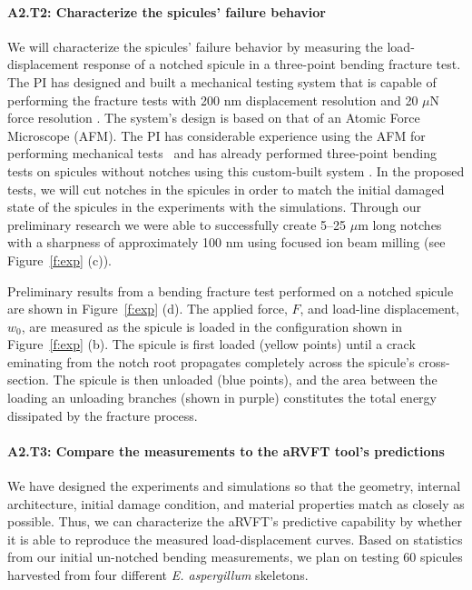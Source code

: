 \documentclass[10pt,letterpaper]{article}
\begin{document}
    \paragraph{A2.T2: Characterize the spicules' failure behavior}
      We will characterize the spicules' failure behavior by measuring the load-displacement response of a notched spicule in a three-point bending fracture test.
      The PI has designed and built a mechanical testing system that is capable of performing the fracture tests with 200 nm displacement resolution and 20 $\mu$N force resolution \cite{monn2017enhanced,monn2017JoVE}. The system's design is based on that of an Atomic Force Microscope (AFM). The PI has considerable experience using the AFM for performing mechanical tests~\cite{kesariPML, kesariThesis} and has already performed three-point bending tests on spicules without notches using this custom-built system \cite{monn2017enhanced,monn2017JoVE,monn2017new}.
      In the proposed tests, we will cut notches in the spicules in order to match the initial damaged state of the spicules in the experiments with the simulations. Through our preliminary research we were able to successfully create 5--25 $\mu$m long notches with a sharpness of approximately 100 nm using focused ion beam milling (see Figure~\ref{f:exp} (c)).

      Preliminary results from a bending fracture test performed on a notched spicule are shown in Figure~\ref{f:exp} (d). The applied force, $F$, and load-line displacement, $w_0$, are measured as the spicule is loaded in the configuration shown in Figure~\ref{f:exp} (b). The spicule is first loaded (yellow points) until a crack eminating from the notch root propagates completely across the spicule's cross-section. The spicule is then unloaded (blue points), and the area between the loading an unloading branches (shown in purple) constitutes the total energy dissipated by the fracture process.

    \paragraph{A2.T3: Compare the measurements to the aRVFT tool's predictions}
      We have designed the experiments and simulations so that the geometry, internal architecture, initial damage condition, and material properties match as closely as possible. Thus, we can characterize the aRVFT's predictive capability by whether it is able to reproduce the measured load-displacement curves. Based on statistics from our initial un-notched bending measurements, we plan on testing 60 spicules harvested from four different \textit{E. aspergillum} skeletons.
\end{document}
